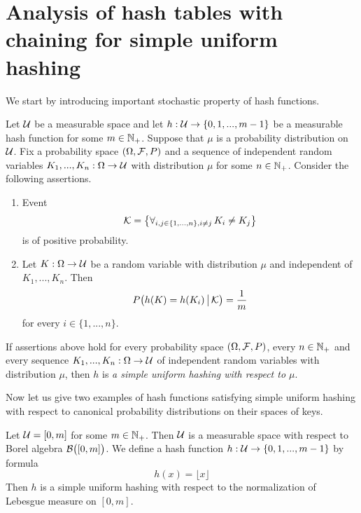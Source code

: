 \section{Analysis of hash tables with chaining for simple uniform hashing}
\noindent
We start by introducing important stochastic property of hash functions.

\begin{definition}
Let ${\mathcal U}$ be a measurable space and let $h:{\mathcal U}\rightarrow \{0,1,...,m-1\}$ be a measurable hash function for some $m\in {\mathbb N}_+$. Suppose that $\mu$ is a probability distribution on ${\mathcal U}$. Fix a probability space $\left(\Omega,{\mathcal F},P\right)$ and a sequence of independent random variables $K_1,...,K_n:\Omega\rightarrow {\mathcal U}$ with distribution $\mu$ for some $n\in {\mathbb N}_+$. Consider the following assertions.
\begin{enumerate}[label=\textbf{(\arabic*)}, leftmargin=3.0em]
\item Event
$${\mathcal K} = \big\{\forall_{i,j\in \{1,...,n\},i\neq j}\,K_i\neq K_j\big\}$$
is of positive probability.
\item Let $K:\Omega\rightarrow {\mathcal U}$ be a random variable with distribution $\mu$ and independent of $K_1,...,K_n$. Then
$$P\big(h(K) = h(K_i)\,\big|\,{\mathcal K}\big) =\frac{1}{m}$$
for every $i\in \{1,...,n\}$.
\end{enumerate}
If assertions above hold for every probability space $(\Omega,{\mathcal F},P)$, every $n\in {\mathbb N}_+$ and every sequence $K_1,...,K_n:\Omega\rightarrow {\mathcal U}$ of independent random variables with distribution $\mu$, then $h$ is \textit{a simple uniform hashing with respect to $\mu$}.
\end{definition}
\noindent
Now let us give two examples of hash functions satisfying simple uniform hashing with respect to canonical probability distributions on their spaces of keys.

\begin{example}\label{example:real_interval_with_floor_hash_function_as_an_example_of_suh}
Let ${\mathcal U} = [0,m]$ for some $m\in {\mathbb N}_+$. Then ${\mathcal U}$ is a measurable space with respect to Borel algebra ${\mathcal B}\big([0,m]\big)$. We define a hash function $h:{\mathcal U}\rightarrow \{0,1,...,m-1\}$ by formula
$$h(x) = \lfloor x \rfloor$$
Then $h$ is a simple uniform hashing with respect to the normalization of Lebesgue measure on $[0,m]$.
\end{example}

